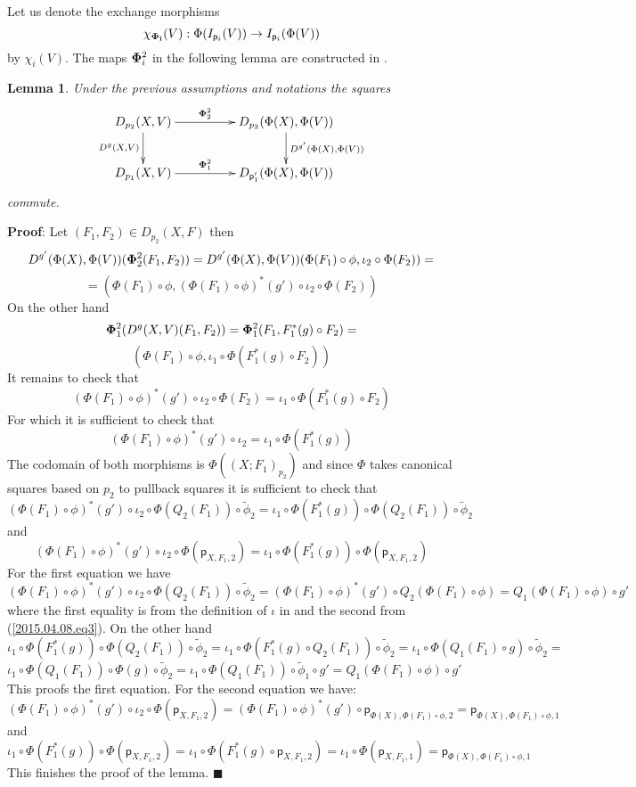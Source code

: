 \documentclass[12pt]{article}
\numberwithin{equation}{section}
\newenvironment{myproof}{{\bf Proof}:}{$\blacksquare$ \vskip 5mm }
\newtheorem{lemma}[proposition]{Lemma}
\newcommand{\llabel}[1]{\label{#1}}
\newcommand{\sr}{\rightarrow}
\newcommand{\wt}{\widetilde}
\newcommand{\p}{\mathsf{p}}
\begin{document}
%
Let us denote the exchange morphisms
%
$$\chi_{\bf\Phi_i}(V):\Phi(I_{\p_i}(V))\sr I_{\p_i}(\Phi(V))$$
%
by $\chi_i(V)$. The maps ${\bf\Phi}_i^2$ in the following lemma are constructed
in \cite[Construction 5.2]{fromunivwithPi}.
%
\begin{lemma}
\llabel{2015.04.08.l1} Under the previous assumptions and notations the squares
%
$$
\begin{xy}
          \xymatrix@C=4pc{ D_{p_2}(X,V) \ar[r]^-{{\bf\Phi}_2^2}
            \ar[d]_{D^g(X,V)} & D_{p_2}(\Phi(X),\Phi(V))
            \ar[d]^{D^{g'}(\Phi(X),\Phi(V))}\\ D_{p_1}(X,V)
            \ar[r]^-{{\bf\Phi}_1^2} & D_{\p_1'}(\Phi(X),\Phi(V)) }
\end{xy}
$$
%
commute.
\end{lemma}
%
\begin{myproof}
Let $(F_1,F_2)\in D_{p_2}(X,F)$ then
%
$$D^{g'}(\Phi(X),\Phi(V))({\bf\Phi}_2^2(F_1,F_2))=D^{g'}(\Phi(X),\Phi(V))(\Phi(F_1)\circ
\phi, \iota_2\circ \Phi(F_2))=$$
$$=(\Phi(F_1)\circ \phi, (\Phi(F_1)\circ \phi)^*(g')\circ \iota_2\circ
\Phi(F_2))$$
%
On the other hand
%
$${\bf\Phi}_1^2(D^g(X,V)(F_1,F_2))={\bf\Phi}_1^2(F_1,F_1^*(g)\circ F_2)=$$
$$(\Phi(F_1)\circ\phi,\iota_1\circ \Phi(F_1^*(g)\circ F_2))$$
%
It remains to check that
%
$$(\Phi(F_1)\circ \phi)^*(g')\circ \iota_2\circ \Phi(F_2)=\iota_1\circ
\Phi(F_1^*(g)\circ F_2)$$
%
For which it is sufficient to check that
%
$$(\Phi(F_1)\circ \phi)^*(g')\circ \iota_2=\iota_1\circ \Phi(F_1^*(g))$$
%
The codomain of both morphisms is $\Phi((X;F_1)_{p_2})$ and since $\Phi$ takes
canonical squares based on $p_2$ to pullback squares it is sufficient to check
that
%
$$(\Phi(F_1)\circ \phi)^*(g')\circ \iota_2\circ
\Phi(Q_2(F_1))\circ\wt{\phi}_2=\iota_1\circ \Phi(F_1^*(g))\circ
\Phi(Q_2(F_1))\circ\wt{\phi}_2$$
%
and
%
$$(\Phi(F_1)\circ \phi)^*(g')\circ \iota_2\circ \Phi(\p_{X,F_1,2})=\iota_1\circ
\Phi(F_1^*(g))\circ \Phi(\p_{X,F_1,2})$$
%
For the first equation we have
%
$$(\Phi(F_1)\circ \phi)^*(g')\circ \iota_2\circ
\Phi(Q_2(F_1))\circ\wt{\phi}_2=(\Phi(F_1)\circ \phi)^*(g')\circ
Q_2(\Phi(F_1)\circ \phi)=Q_1(\Phi(F_1)\circ\phi)\circ g'$$
%
where the first equality is from the definition of $\iota$ in
\cite[Construction 5.2]{fromunivwithPi} and the second from
(\ref{2015.04.08.eq3}). On the other hand
%
$$\iota_1\circ \Phi(F_1^*(g))\circ
\Phi(Q_2(F_1))\circ\wt{\phi}_2=\iota_1\circ\Phi(F_1^*(g)\circ Q_2(F_1))\circ
\wt{\phi}_2=\iota_1\circ \Phi(Q_1(F_1)\circ g)\circ \wt{\phi}_2=$$
$$\iota_1\circ \Phi(Q_1(F_1))\circ \Phi(g)\circ \wt{\phi}_2=\iota_1\circ
\Phi(Q_1(F_1))\circ \wt{\phi}_1\circ g'=Q_1(\Phi(F_1)\circ \phi)\circ g'$$
%
This proofs the first equation. For the second equation we have:
%
$$(\Phi(F_1)\circ \phi)^*(g')\circ \iota_2\circ
\Phi(\p_{X,F_1,2})=(\Phi(F_1)\circ \phi)^*(g')\circ
\p_{\Phi(X),\Phi(F_1)\circ\phi,2}=\p_{\Phi(X),\Phi(F_1)\circ\phi,1}$$
%
and
%
$$\iota_1\circ \Phi(F_1^*(g))\circ \Phi(\p_{X,F_1,2})=\iota_1\circ
\Phi(F_1^*(g)\circ \p_{X,F_1,2})=\iota_1\circ
\Phi(\p_{X,F_1,1})=\p_{\Phi(X),\Phi(F_1)\circ \phi,1}$$
%
This finishes the proof of the lemma.
\end{myproof}
\end{document}
